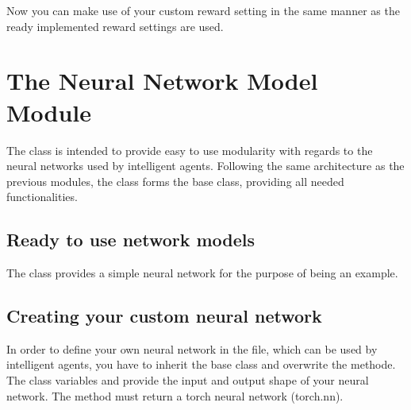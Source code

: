 \documentclass[letterpaper,10pt,english]{sphinxmanual}
\begin{document}
\sphinxAtStartPar
Now you can make use of your custom reward setting in the same manner as the ready implemented reward settings are used.


\section{The Neural Network Model Module}
\label{\detokenize{MultiAgentMarketRL:the-neural-network-model-module}}
\sphinxAtStartPar
The  class is intended to provide easy to use modularity with regards to the neural networks used by
intelligent agents. Following the same architecture as the previous modules, the  class forms the base
class, providing all needed functionalities.


\subsection{Ready to use network models}
\label{\detokenize{MultiAgentMarketRL:ready-to-use-network-models}}
\sphinxAtStartPar
The  class provides a simple neural network for the purpose of being an example.


\subsection{Creating your custom neural network}
\label{\detokenize{MultiAgentMarketRL:creating-your-custom-neural-network}}
\sphinxAtStartPar
In order to define your own neural network in the  file, which can be used by intelligent agents,
you have to inherit the  base class and overwrite the  methode. The class variables
 and  provide the input and output shape of your neural network. The method must return
a torch neural network (torch.nn).
\end{document}
